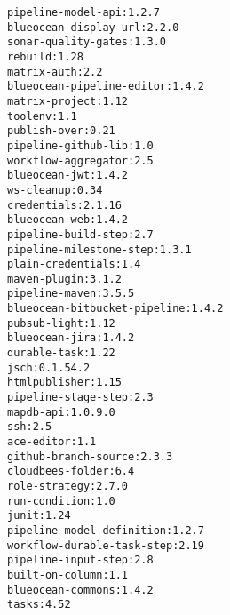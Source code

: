 \begin{lstlisting}
pipeline-model-api:1.2.7
blueocean-display-url:2.2.0
sonar-quality-gates:1.3.0
rebuild:1.28
matrix-auth:2.2
blueocean-pipeline-editor:1.4.2
matrix-project:1.12
toolenv:1.1
publish-over:0.21
pipeline-github-lib:1.0
workflow-aggregator:2.5
blueocean-jwt:1.4.2
ws-cleanup:0.34
credentials:2.1.16
blueocean-web:1.4.2
pipeline-build-step:2.7
pipeline-milestone-step:1.3.1
plain-credentials:1.4
maven-plugin:3.1.2
pipeline-maven:3.5.5
blueocean-bitbucket-pipeline:1.4.2
pubsub-light:1.12
blueocean-jira:1.4.2
durable-task:1.22
jsch:0.1.54.2
htmlpublisher:1.15
pipeline-stage-step:2.3
mapdb-api:1.0.9.0
ssh:2.5
ace-editor:1.1
github-branch-source:2.3.3
cloudbees-folder:6.4
role-strategy:2.7.0
run-condition:1.0
junit:1.24
pipeline-model-definition:1.2.7
workflow-durable-task-step:2.19
pipeline-input-step:2.8
built-on-column:1.1
blueocean-commons:1.4.2
tasks:4.52
\end{lstlisting}